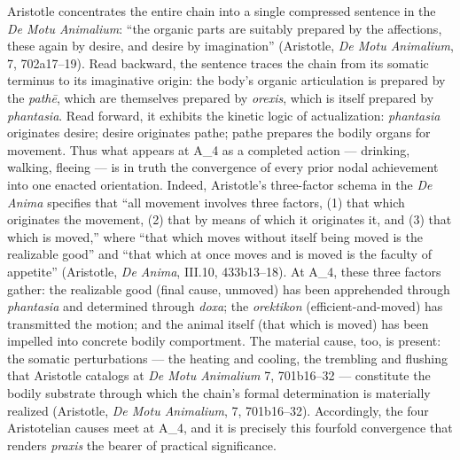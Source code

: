 \documentclass{article}
\begin{document}
Aristotle concentrates the entire chain into a single compressed sentence in the \textit{De Motu Animalium}: ``the organic parts are suitably prepared by the affections, these again by desire, and desire by imagination'' (Aristotle, \textit{De Motu Animalium}, 7, 702a17--19). Read backward, the sentence traces the chain from its somatic terminus to its imaginative origin: the body's organic articulation is prepared by the \textit{path\={e}}, which are themselves prepared by \textit{orexis}, which is itself prepared by \textit{phantasia}. Read forward, it exhibits the kinetic logic of actualization: \textit{phantasia} originates desire; desire originates pathe; pathe prepares the bodily organs for movement. Thus what appears at A\_4 as a completed action --- drinking, walking, fleeing --- is in truth the convergence of every prior nodal achievement into one enacted orientation. Indeed, Aristotle's three-factor schema in the \textit{De Anima} specifies that ``all movement involves three factors, (1) that which originates the movement, (2) that by means of which it originates it, and (3) that which is moved,'' where ``that which moves without itself being moved is the realizable good'' and ``that which at once moves and is moved is the faculty of appetite'' (Aristotle, \textit{De Anima}, III.10, 433b13--18). At A\_4, these three factors gather: the realizable good (final cause, unmoved) has been apprehended through \textit{phantasia} and determined through \textit{doxa}; the \textit{orektikon} (efficient-and-moved) has transmitted the motion; and the animal itself (that which is moved) has been impelled into concrete bodily comportment. The material cause, too, is present: the somatic perturbations --- the heating and cooling, the trembling and flushing that Aristotle catalogs at \textit{De Motu Animalium} 7, 701b16--32 --- constitute the bodily substrate through which the chain's formal determination is materially realized (Aristotle, \textit{De Motu Animalium}, 7, 701b16--32). Accordingly, the four Aristotelian causes meet at A\_4, and it is precisely this fourfold convergence that renders \textit{praxis} the bearer of practical significance.
\end{document}
